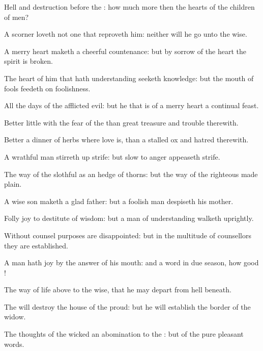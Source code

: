 {Hell and
destruction
{} before the
{}: how much more then the
hearts of the
children of
men?

A
scorner
loveth not one that
reproveth him: neither will he
go unto the
wise.

A
merry
heart maketh a
cheerful
countenance: but by
sorrow of the
heart the
spirit is
broken.

The
heart of him that hath
understanding
seeketh
knowledge: but the
mouth of
fools
feedeth on
foolishness.

All the
days of the
afflicted
{}
evil: but he that is of a
merry
heart
{} a
continual
feast.


\par }{\PP {}Better
{}
little with the
fear of the
{} than
great
treasure and
trouble therewith.

Better
{} a
dinner of
herbs where
love is, than a
stalled
ox and
hatred therewith.

A
wrathful
man stirreth
up
strife: but
{}
slow to
anger
appeaseth
strife.

The
way of the
slothful
{} as an
hedge of
thorns: but the
way of the
righteous
{} made
plain.

A
wise
son maketh a
glad
father: but a
foolish
man
despiseth his
mother.

Folly
{}
joy to
{}
destitute of
wisdom: but a
man of
understanding
walketh
uprightly.

Without
counsel
purposes are
disappointed: but in the
multitude of
counsellors they are
established.

A
man hath
joy by the
answer of his
mouth: and a
word
{} in due
season, how
good
{}!

The
way of
life
{}
above to the
wise, that he may
depart from
hell
beneath.

The
{} will
destroy the
house of the
proud: but he will
establish the
border of the
widow.

The
thoughts of the
wicked
{} an
abomination to the
{}: but
{} of the
pure
{}
pleasant
words.

}
